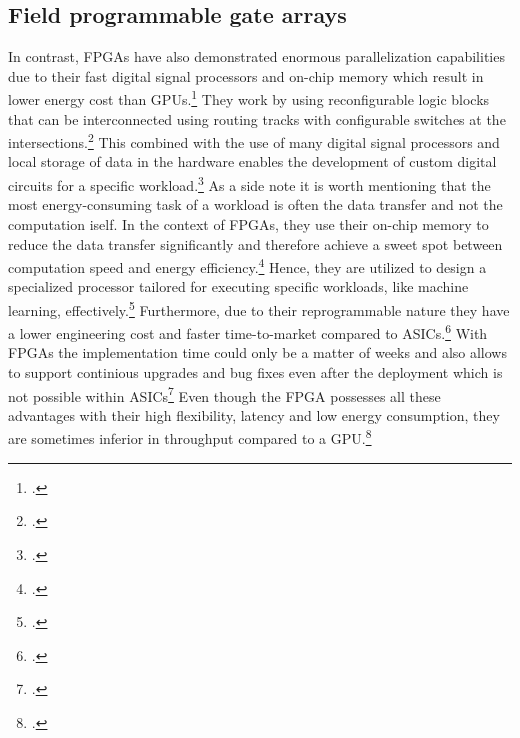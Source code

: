\subsection{Field programmable gate arrays}
In contrast, \ac{FPGA}s have also demonstrated enormous parallelization capabilities due to their fast digital signal processors and on-chip
memory which result in lower energy cost than GPUs.\footcite[cf.][2693]{ahmadOptimizingHardwareAccelerated2020}
They work by using reconfigurable logic blocks that can be interconnected using routing tracks with configurable switches at the intersections.\footcite[cf.][144]{babuReconfigurableFPGAArchitectures2021}
This combined with the use of many digital signal processors and local storage of data in the hardware enables the development of custom digital circuits for a specific workload.\footcite[cf.][19]{baischerLearningHardwareTutorial2021}
As a side note it is worth mentioning that the most energy-consuming task of a workload is often the data transfer and not the computation iself.
In the context of \ac{FPGA}s, they use their on-chip memory to reduce the data transfer significantly and therefore achieve a sweet spot between computation speed and energy efficiency.\footcite[cf.][101-102]{huSurveyConvolutionalNeural2022}
Hence, they are utilized to design a specialized processor tailored for executing specific workloads, like machine learning, effectively.\footcite[cf.][322]{sipolaArtificialIntelligenceIoT2022}
Furthermore, due to their reprogrammable nature they have a lower engineering cost and faster time-to-market compared to \ac{ASIC}s.\footcite[cf.][4]{boutrosFPGAArchitecturePrinciples2021}
With \ac{FPGA}s the implementation time could only be a matter of weeks and also allows to support continious upgrades and bug fixes even after the deployment which is not possible within \ac{ASIC}s\footcite[cf.][4]{boutrosFPGAArchitecturePrinciples2021}
Even though the \ac{FPGA} possesses all these advantages with their high flexibility, latency and low energy consumption, they are sometimes inferior in throughput compared to a \ac{GPU}.\footcite[cf.][100]{huSurveyConvolutionalNeural2022}

